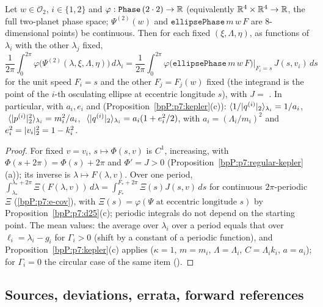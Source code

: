 \begin{corollary}\label{bpP:p7:average}
Let $w\in\mathcal O_2$, $i\in\{1,2\}$ and $\varphi:\texttt{Phase}\,(2\cdot2)\to\mathbb{R}$ (equivalently $\mathbb{R}^4\times\mathbb{R}^4\to\mathbb{R}$, the full two-planet phase space; $\Psi^{(2)}(w)$ and $\texttt{ellipsePhase}\,m\,w\,F$ are $8$-dimensional points) be continuous. Then for each fixed $(\xi,\Lambda,\eta)$, as functions of $\lambda_i$ with the other $\lambda_j$ fixed,
\[\frac1{2\pi}\int_0^{2\pi}\varphi\bigl(\Psi^{(2)}(\lambda,\xi,\Lambda,\eta)\bigr)\,d\lambda_i=\frac1{2\pi}\int_0^{2\pi}\varphi\bigl(\texttt{ellipsePhase}\,m\,w\,F\bigr)\Big|_{F_i=s}\,J(s,v_i)\,ds\]
for the unit speed $F_i=s$ and the other $F_j=F_j(w)$ fixed (the integrand is the point of the $i$-th osculating ellipse at eccentric longitude $s$), with $J=$ . In particular, with $a_i,e_i$ and (Proposition~\ref{bpP:p7:kepler}(c)):
$\langle1/\lvert q^{(i)}\rvert_2\rangle_{\lambda_i}=1/a_i$, $\ \langle\pl{p^{(i)}}^2\rangle_{\lambda_i}=m_i^2/a_i$, $\ \langle\pl{q^{(i)}}\rangle_{\lambda_i}=a_i(1+e_i^2/2)$, with $a_i=(\Lambda_i/m_i)^2$ and $e_i^2=\lvert v_i\rvert_2^2=1-k_i^2$.
\end{corollary}
\begin{proof}
\label{stepP:p7:av-cov} For fixed $v=v_i$, $s\mapsto\Phi(s,v)$ is $C^1$, increasing, with $\Phi(s+2\pi)=\Phi(s)+2\pi$ and $\Phi'=J>0$ (Proposition~\ref{bpP:p7:regular-kepler}(a)); its inverse is $\lambda\mapsto F(\lambda,v)$. Over one period, $\int_{\lambda_*}^{\lambda_*+2\pi}\Xi(F(\lambda,v))\,d\lambda=\int_{F_*}^{F_*+2\pi}\Xi(s)J(s,v)\,ds$ for continuous $2\pi$-periodic $\Xi$ (\ref{bpP:p7:e-cov}), with $\Xi(s)=\varphi(\Psi\text{ at eccentric longitude }s)$ by Proposition~\ref{bpP:p7:d25}(c); periodic integrals do not depend on the starting point. \label{stepP:p7:av-mean} The mean values: the average over $\lambda_i$ over a period equals that over $\ell_i=\lambda_i-g_i$ for $\Gamma_i>0$ (shift by a constant of a periodic function), and Proposition~\ref{bpP:p7:kepler}(c) applies ($\kappa=1$, $m=m_i$, $\Lambda=\Lambda_i$, $C=\Lambda_ik_i$, $a=a_i$); for $\Gamma_i=0$ the circular case of the same item ().
\end{proof}

\subsection{Sources, deviations, errata, forward references}\label{bpP:p7:notes}

